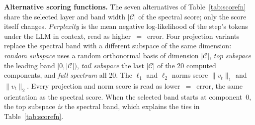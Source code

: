 


\textbf{Alternative scoring functions.}
The seven alternatives of Table~\ref{tab:scorefn} share the selected layer and band width $|\mathcal{C}|$ of the spectral score; only the score itself changes. \emph{Perplexity} is the mean negative log-likelihood of the step's tokens under the LLM in context, read as higher~$=$~error. Four projection variants replace the spectral band with a different subspace of the same dimension: \emph{random subspace} uses a random orthonormal basis of dimension $|\mathcal{C}|$, \emph{top subspace} the leading band $[0, |\mathcal{C}|)$, \emph{tail subspace} the last $|\mathcal{C}|$ of the 20 computed components, and \emph{full spectrum} all 20. The $\ell_1$ and $\ell_2$ norms score $\|v_t\|_1$ and $\|v_t\|_2$. Every projection and norm score is read as lower~$=$~error, the same orientation as the spectral score. When the selected band starts at component~0, the top subspace \emph{is} the spectral band, which explains the ties in Table~\ref{tab:scorefn}.

